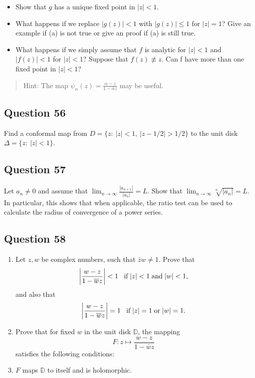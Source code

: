 \documentclass[12pt]{article}
\begin{document}
\begin{itemize}
\item
  Show that \(g\) has a unique fixed point in \(|z| < 1\).
\item
  What happens if we replace \(|g(z)| < 1\) with \(|g(z)|\leq 1\) for
  \(|z|=1\)? Give an example if (a) is not true or give an proof if (a)
  is still true.
\item
  What happens if we simply assume that \(f\) is analytic for
  \(|z| < 1\) and \(|f(z)| < 1\) for \(|z| < 1\)? Suppose that
  \(f(z) \not\equiv z\). Can f have more than one fixed point in
  \(|z| < 1\)?
\end{itemize}

\begin{quote}
Hint: The map
\(\displaystyle{\psi_{\alpha}(z)=\frac{\alpha-z}{1-\bar{\alpha}z}}\) may
be useful.
\end{quote}

\hypertarget{question-56-2}{%
\subsection{Question 56}\label{question-56-2}}

Find a conformal map from \(D = \{z :\  |z| < 1,\ |z - 1/2| > 1/2\}\) to
the unit disk \(\Delta=\{z: \ |z|<1\}\).

\hypertarget{question-57-2}{%
\subsection{Question 57}\label{question-57-2}}

Let \(a_n \neq 0\) and assume that
\(\displaystyle \lim_{n \rightarrow \infty} \frac{|a_{n+1}|}{|a_n|} = L\).
Show that
\(\displaystyle \lim_{n \rightarrow \infty} \sqrt[n]{|a_n|} = L. %
\) In particular, this shows that when applicable, the ratio test can be
used to calculate the radius of convergence of a power series.

\hypertarget{question-58-2}{%
\subsection{Question 58}\label{question-58-2}}

\begin{enumerate}
\def\labelenumi{(\alph{enumi})}
\item
  Let \(z, w\) be complex numbers, such that \(\bar{z} w \neq 1\). Prove
  that
  \[{\left\lvert {\frac{w - z}{1 - \overline{w} z}} \right\rvert} < 1 \; \; \; \mbox{if} \; |z| < 1 \; \mbox{and}\; |w| < 1,\]
  and also that
  \[{\left\lvert {\frac{w - z}{1 - \overline{w} z}} \right\rvert} = 1 \; \; \; \mbox{if} \; |z| = 1 \; \mbox{or}\; |w| = 1.\]
\item
  Prove that for fixed \(w\) in the unit disk \(\mathbb D\), the mapping
  \[F: z \mapsto \frac{w - z}{1 - \bar{w} z}\] satisfies the following
  conditions:
\item
  \(F\) maps \(\mathbb D\) to itself and is holomorphic.~
\end{enumerate}
\end{document}
